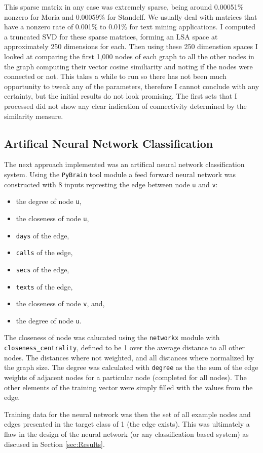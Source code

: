 This sparse matrix in any case was extremely sparse, being around 0.00051\%
nonzero for Moria and 0.00059\% for Standelf.  We usually deal with matrices
that have a nonzero rate of 0.001\% to 0.01\% for text mining applications.  I
computed a truncated SVD for these sparse matrices, forming an LSA space at
approximately 250 dimensions for each.  Then using these 250 dimenstion spaces
I looked at comparing the first 1,000 nodes of each graph to all the other
nodes in the graph computing their vector cosine similiarity and noting if the
nodes were connected or not.  This takes a while to run so there has not been
much opportunity to tweak any of the parameters, therefore I cannot conclude
with any certainty, but the initial results do not look promising.  The first
sets that I  processed did not show any clear indication of connectivity
determined by the similarity measure.

\subsection{Artifical Neural Network Classification}
The next approach implemented was an artifical neural network classification system.
Using the \verb+PyBrain+ tool module a feed forward neural network was constructed with 8 inputs represting the edge between node \texttt{u} and \texttt{v}:
\begin{itemize}
	\item the degree of node \texttt{u},
	\item the closeness of node \texttt{u},
	\item \texttt{days} of the edge,
	\item \texttt{calls} of the edge,
	\item \texttt{secs} of the edge,
	\item \texttt{texts} of the edge,
	\item the closeness of node \texttt{v}, and,
	\item the degree of node \texttt{u}.
\end{itemize}
The closeness of node was calucated using the \verb+networkx+ module with \verb+closeness_centrality+, defined to be 1 over the average distance to all other nodes. The distances where not weighted, and all distances where normalized by the graph size.
The degree was calculated with \verb+degree+ as the the sum of the edge weights of adjacent nodes for a particular node (completed for all nodes).
The other elements of the training vector were simply filled with the values from the edge.

Training data for the neural network was then the set of all example nodes and edges presented in the target class of 1 (the edge exists). This was ultimately a flaw in the design of the neural network (or any classification based system) as discused in Section \ref{sec:Results}.
